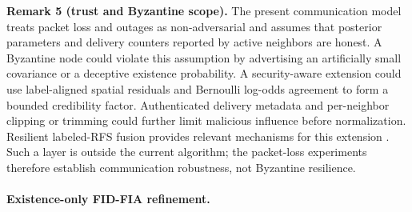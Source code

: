 \noindent\textbf{Remark 5 (trust and Byzantine scope).}
The present communication model treats packet loss and outages as non-adversarial and assumes that posterior parameters and delivery counters reported by active neighbors are honest. A Byzantine node could violate this assumption by advertising an artificially small covariance or a deceptive existence probability. A security-aware extension could use label-aligned spatial residuals and Bernoulli log-odds agreement to form a bounded credibility factor. Authenticated delivery metadata and per-neighbor clipping or trimming could further limit malicious influence before normalization. Resilient labeled-RFS fusion provides relevant mechanisms for this extension \cite{Gao2023ResilientLMB}. Such a layer is outside the current algorithm; the packet-loss experiments therefore establish communication robustness, not Byzantine resilience.

\paragraph{Existence-only FID-FIA refinement.}

